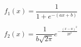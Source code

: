 \documentclass[14pt]{amsart}
\title{}
\author{}
\begin{document}
\maketitle

$$
f_1(x) = \frac{1}{1+e^{-(ax+b)}}
$$

$$
f_2(x) = \frac{1}{b \sqrt{2\pi}}e^{-\frac{(x-a)^2}{2b^2}}
$$
\end{document}
